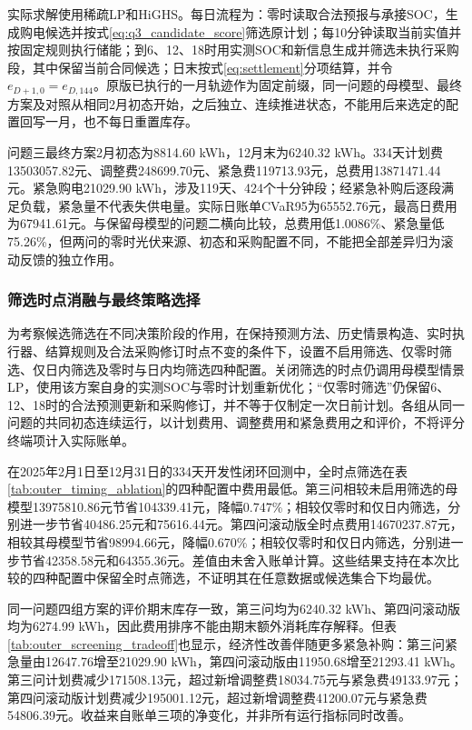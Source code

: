 

实际求解使用稀疏LP和HiGHS。每日流程为：零时读取合法预报与承接SOC，生成购电候选并按式\eqref{eq:q3_candidate_score}筛选原计划；每10分钟读取当前实值并按固定规则执行储能；到6、12、18时用实测SOC和新信息生成并筛选未执行采购段，其中保留当前合同候选；日末按式\eqref{eq:settlement}分项结算，并令$e_{D+1,0}=e_{D,144}$。原版已执行的一月轨迹作为固定前缀，同一问题的母模型、最终方案及对照从相同2月初态开始，之后独立、连续推进状态，不能用后来选定的配置回写一月，也不每日重置库存。

问题三最终方案2月初态为8814.60 kWh，12月末为6240.32 kWh。334天计划费13503057.82元、调整费248699.70元、紧急费119713.93元，总费用13871471.44元。紧急购电21029.90 kWh，涉及119天、424个十分钟段；经紧急补购后逐段满足负载，紧急量不代表失供电量。实际日账单CVaR95为65552.76元，最高日费用为67941.61元。与保留母模型的问题二横向比较，总费用低1.0086\%、紧急量低75.26\%，但两问的零时光伏来源、初态和采购配置不同，不能把全部差异归为滚动反馈的独立作用。

\subsubsection{筛选时点消融与最终策略选择}
\label{sec:q3_screening_ablation}

为考察候选筛选在不同决策阶段的作用，在保持预测方法、历史情景构造、实时执行器、结算规则及合法采购修订时点不变的条件下，设置不启用筛选、仅零时筛选、仅日内筛选及零时与日内均筛选四种配置。关闭筛选的时点仍调用母模型情景LP，使用该方案自身的实测SOC与零时计划重新优化；“仅零时筛选”仍保留6、12、18时的合法预测更新和采购修订，并不等于仅制定一次日前计划。各组从同一问题的共同初态连续运行，以计划费用、调整费用和紧急费用之和评价，不将评分终端项计入实际账单。



在2025年2月1日至12月31日的334天开发性闭环回测中，全时点筛选在表\ref{tab:outer_timing_ablation}的四种配置中费用最低。第三问相较未启用筛选的母模型13975810.86元节省104339.41元，降幅0.747\%；相较仅零时和仅日内筛选，分别进一步节省40486.25元和75616.44元。第四问滚动版全时点费用14670237.87元，相较其母模型节省98994.66元，降幅0.670\%；相较仅零时和仅日内筛选，分别进一步节省42358.58元和64355.36元。差值由未舍入账单计算。这些结果支持在本次比较的四种配置中保留全时点筛选，不证明其在任意数据或候选集合下均最优。



同一问题四组方案的评价期末库存一致，第三问均为6240.32 kWh、第四问滚动版均为6274.99 kWh，因此费用排序不能由期末额外消耗库存解释。但表\ref{tab:outer_screening_tradeoff}也显示，经济性改善伴随更多紧急补购：第三问紧急量由12647.76增至21029.90 kWh，第四问滚动版由11950.68增至21293.41 kWh。第三问计划费减少171508.13元，超过新增调整费18034.75元与紧急费49133.97元；第四问滚动版计划费减少195001.12元，超过新增调整费41200.07元与紧急费54806.39元。收益来自账单三项的净变化，并非所有运行指标同时改善。

